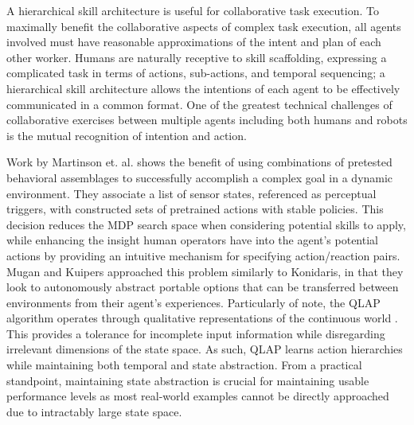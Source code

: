 \documentclass[letterpaper]{article}
\begin{document}
  A hierarchical skill architecture is useful for collaborative task execution. To maximally benefit the collaborative aspects of complex task execution, all agents involved must have reasonable approximations of the intent and plan of each other worker. Humans are naturally receptive to skill scaffolding, expressing a complicated task in terms of actions, sub-actions, and temporal sequencing; a hierarchical skill architecture allows the intentions of each agent to be effectively communicated in a common format. One of the greatest technical challenges of collaborative exercises between multiple agents including both humans and robots is the mutual recognition of intention and action.
 
  Work by Martinson et. al.  shows the benefit of using combinations of pretested behavioral assemblages to successfully accomplish a complex goal in a dynamic environment. They associate a list of sensor states, referenced as perceptual triggers, with constructed sets of pretrained actions with stable policies. This decision reduces the MDP search space when considering potential skills to apply, while enhancing the insight human operators have into the agent's potential actions by providing an intuitive mechanism for specifying action/reaction pairs. Mugan and Kuipers  approached this problem similarly to Konidaris, in that they look to autonomously abstract portable options that can be transferred between environments from their agent's experiences. Particularly of note, the QLAP algorithm operates through qualitative representations of the continuous world \cite{AutoHierarchyLearning}. This provides a tolerance for incomplete input information while disregarding irrelevant dimensions of the state space. As such, QLAP learns action hierarchies while maintaining both temporal and state abstraction. From a practical standpoint, maintaining state abstraction is crucial for maintaining usable performance levels as most real-world examples cannot be directly approached due to intractably large state space.
\end{document}
